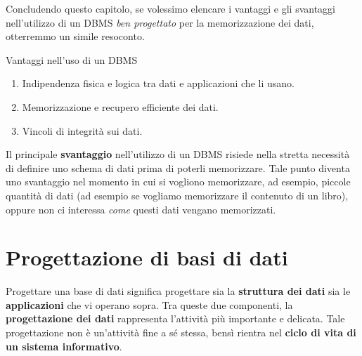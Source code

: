 \documentclass[12pt]{report}
\begin{document}
	Concludendo questo capitolo, se volessimo elencare i vantaggi e gli svantaggi nell'utilizzo di un DBMS \textit{ben progettato} per la memorizzazione dei dati, otterremmo un simile resoconto.
	\begin{osservazione}{Vantaggi nell'uso di un DBMS}{}
		\begin{enumerate}
			\item Indipendenza fisica e logica tra dati e applicazioni che li usano.
			
			\item Memorizzazione e recupero efficiente dei dati.
			
			\item Vincoli di integrità sui dati.
		\end{enumerate}
	\end{osservazione}	
	
	Il principale \textbf{svantaggio} nell'utilizzo di un DBMS risiede nella stretta necessità di definire uno schema di dati prima di poterli memorizzare. Tale punto diventa uno svantaggio nel momento in cui si vogliono memorizzare, ad esempio, piccole quantità di dati (ad esempio se vogliamo memorizzare il contenuto di un libro), oppure non ci interessa \textit{come} questi dati vengano memorizzati.
	
	\chapter{Progettazione di basi di dati}
	
	Progettare una base di dati significa progettare sia la \textbf{struttura dei dati} sia le \textbf{applicazioni} che vi operano sopra. Tra queste due componenti, la \textbf{progettazione dei dati} rappresenta l'attività più importante e delicata.
	Tale progettazione non è un'attività fine a sé stessa, bensì rientra nel \textbf{ciclo di vita di un sistema informativo}.
	
\end{document}
